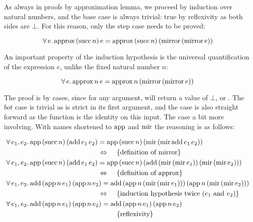 As always in proofs by approximation lemma, we proceed by induction
over natural numbers, and the base case is always trivial: true by
reflexivity as both sides are $\bot$. For this reason, only the step
case needs to be proved:

\begin{equation*}
\forall \, e . \,  \mathrm{approx} \, (\mathrm{succ} \, n) \, e = \mathrm{approx} \, (\mathrm{succ} \, n) \, (\mathrm{mirror} \, (\mathrm{mirror} \, e))
\end{equation*}

An important property of the induction hypothesis is the universal
quantification of the expression $e$, unlike the fixed natural number
$n$:

\begin{equation*}
\forall \, e . \,  \mathrm{approx} \, n \, e = \mathrm{approx} \, n \, (\mathrm{mirror} \, (\mathrm{mirror} \, e))
\end{equation*}

The proof is by cases, since for any argument,  will return
a value of $\bot$,  or .  The $bot$ case is trivial
as  is strict in its first argument, and the 
case is also straight forward as the function is the identity on this
input. The  case a bit more involving. With names shortened to
$\mathrm{app}$ and $\mathrm{mir}$ the reasoning is as follows:

\newcommand{\Adds}[2]{\fn{add} \, #1 e_1 #2 \, #1 e_2 #2}
\newcommand{\Approxn}[0]{\fn{app} \, n \,}
\newcommand{\ApproxSuccn}[0]{\fn{app} \, (\fn{succ} \, n) \,}
\newcommand{\mirmir}[0]{\fn{mir} \, (\fn{mir} \, }
\begin{align*}
\faa{e_1}{e_2}&  \ApproxSuccn (\Adds{}{})  = \ApproxSuccn (\mirmir \Adds{}{} ))                                                                   \\
                                                                                 \desclra{\defof{$\fn{mirror}$}}                                   \\
\faa{e_1}{e_2}&  \ApproxSuccn (\Adds{}{})  = \ApproxSuccn (\Adds{(\mirmir}{))})                                                                    \\
                                                                                \desclra{\defof{$\fn{approx}$}}                                    \\
\faa{e_1}{e_2}&  \Adds{(\Approxn}{)}      = \Adds{(\Approxn(\mirmir}{)))}                                                                        \\
                                                                                \desclra{induction hypothesis twice ($e_1$ and $e_2$)} \\
\faa{e_1}{e_2}&  \Adds{(\Approxn}{)}      = \Adds{(\Approxn}{)}                                                                                  \\
                                                                                \desca{reflexivity}                                              \\
\end{align*}

